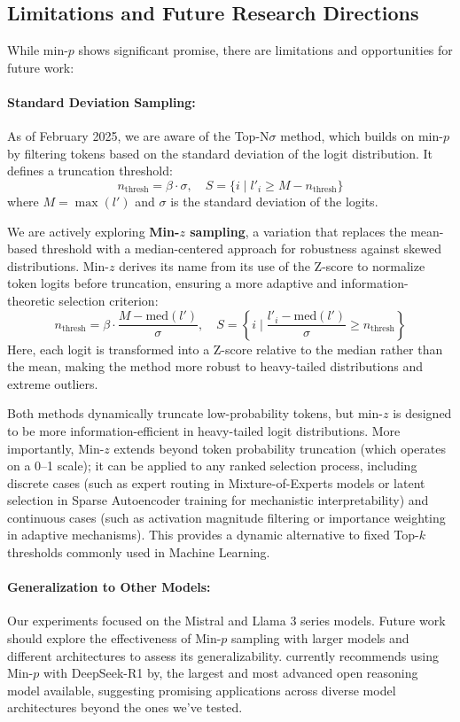 \documentclass{article}
\begin{document}
\subsection{Limitations and Future Research Directions}
\label{sec:limitations}

While min-\( p \) shows significant promise, there are limitations and opportunities for future work:

\paragraph{Standard Deviation Sampling:} As of February 2025, we are aware of the Top-N\(\sigma\) \citep{tang2024topnsigmalogitsneed} method, which builds on min-\( p \) by filtering tokens based on the standard deviation of the logit distribution. It defines a truncation threshold:
\[
n_{\text{thresh}} = \beta \cdot \sigma, \quad S = \{ i \mid l'_i \geq M - n_{\text{thresh}} \}
\]
where \( M = \max(l') \) and \( \sigma \) is the standard deviation of the logits. 

We are actively exploring \textbf{Min-\( z \) sampling}, a variation that replaces the mean-based threshold with a median-centered approach for robustness against skewed distributions. Min-\( z \) derives its name from its use of the Z-score to normalize token logits before truncation, ensuring a more adaptive and information-theoretic selection criterion:
\[
n_{\text{thresh}} = \beta \cdot \frac{M - \text{med}(l')}{\sigma}, \quad S = \left\{ i \mid \frac{l'_i - \text{med}(l')}{\sigma} \geq n_{\text{thresh}} \right\}
\]
Here, each logit is transformed into a Z-score relative to the median rather than the mean, making the method more robust to heavy-tailed distributions and extreme outliers.

Both methods dynamically truncate low-probability tokens, but min-\( z \) is designed to be more information-efficient in heavy-tailed logit distributions. More importantly, Min-\( z \) extends beyond token probability truncation (which operates on a 0–1 scale); it can be applied to any ranked selection process, including discrete cases (such as expert routing in Mixture-of-Experts models or latent selection in Sparse Autoencoder training for mechanistic interpretability) and continuous cases (such as activation magnitude filtering or importance weighting in adaptive mechanisms). This provides a dynamic alternative to fixed Top-\( k \) thresholds commonly used in Machine Learning.

\paragraph{Generalization to Other Models:} Our experiments focused on the Mistral and Llama 3 series models. Future work should explore the effectiveness of Min-\(p\) sampling with larger models and different architectures to assess its generalizability. \cite{unsloth2025deepseekr1gguf} currently recommends using Min-\(p\) with DeepSeek-R1 by, the largest and most advanced open reasoning model available, suggesting promising applications across diverse model architectures beyond the ones we've tested.
\end{document}
